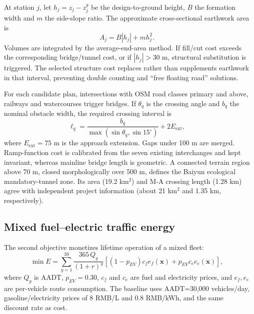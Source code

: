 \documentclass[preprint,12pt]{elsarticle}
\begin{document}
At station $j$, let $h_j=z_j-z^g_j$ be the design-to-ground height, $B$ the formation width and $m$ the side-slope ratio. The approximate cross-sectional earthwork area is
\begin{equation}
A_j=B|h_j|+m h_j^2.
\end{equation}
Volumes are integrated by the average-end-area method. If fill/cut cost exceeds the corresponding bridge/tunnel cost, or if $|h_j|>30$ m, structural substitution is triggered. The selected structure cost replaces rather than supplements earthwork in that interval, preventing double counting and ``free floating road'' solutions.

For each candidate plan, intersections with OSM road classes primary and above, railways and watercourses trigger bridges. If $\theta_q$ is the crossing angle and $b_q$ the nominal obstacle width, the required crossing interval is
\begin{equation}
\ell_q=\frac{b_q}{\max(\sin\theta_q,\sin15^\circ)}+2E_{\mathrm{ext}},
\end{equation}
where $E_{\mathrm{ext}}=75$ m is the approach extension. Gaps under 100 m are merged. Ramp-function cost is calibrated from the seven existing interchanges and kept invariant, whereas mainline bridge length is geometric. A connected terrain region above 70 m, closed morphologically over 500 m, defines the Baiyun ecological mandatory-tunnel zone. Its area (19.2 km$^2$) and M-A crossing length (1.28 km) agree with independent project information (about 21 km$^2$ and 1.35 km, respectively).

\subsection{Mixed fuel--electric traffic energy}

The second objective monetizes lifetime operation of a mixed fleet:
\begin{equation}
\min E=\sum_{y=1}^{30}\frac{365\,Q_y}{(1+r)^y}
\left[(1-p_{EV})c_f e_f(\bm x)+p_{EV}c_e e_e(\bm x)\right],
\label{eq:energy}
\end{equation}
where $Q_y$ is AADT, $p_{EV}=0.30$, $c_f$ and $c_e$ are fuel and electricity prices, and $e_f,e_e$ are per-vehicle route consumption. The baseline uses AADT=30,000 vehicles/day, gasoline/electricity prices of 8 RMB/L and 0.8 RMB/kWh, and the same discount rate as cost.
\end{document}
